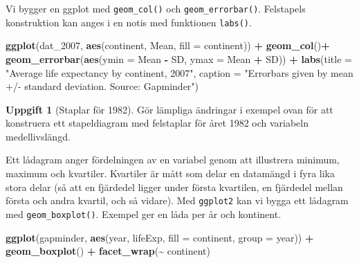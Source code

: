 \documentclass[
]{book}
\newenvironment{Shaded}{\begin{snugshade}}{\end{snugshade}}
\newcommand{\AttributeTok}[1]{\textcolor[rgb]{0.13,0.29,0.53}{#1}}
\newcommand{\FunctionTok}[1]{\textcolor[rgb]{0.13,0.29,0.53}{\textbf{#1}}}
\newcommand{\NormalTok}[1]{#1}
\newcommand{\SpecialCharTok}[1]{\textcolor[rgb]{0.81,0.36,0.00}{\textbf{#1}}}
\newcommand{\StringTok}[1]{\textcolor[rgb]{0.31,0.60,0.02}{#1}}
\theoremstyle{definition}
\theoremstyle{definition}
\theoremstyle{definition}
\newtheorem{exercise}{Uppgift}[chapter]
\theoremstyle{definition}
\theoremstyle{remark}
\begin{document}
Vi bygger en ggplot med \texttt{geom\_col()} och \texttt{geom\_errorbar()}. Felstapels konstruktion kan anges i en notis med funktionen \texttt{labs()}.

\begin{Shaded}
\begin{Highlighting}[]
\FunctionTok{ggplot}\NormalTok{(dat\_2007, }\FunctionTok{aes}\NormalTok{(continent, Mean, }\AttributeTok{fill =}\NormalTok{ continent)) }\SpecialCharTok{+}
  \FunctionTok{geom\_col}\NormalTok{()}\SpecialCharTok{+}                                            
  \FunctionTok{geom\_errorbar}\NormalTok{(}\FunctionTok{aes}\NormalTok{(}\AttributeTok{ymin =}\NormalTok{ Mean }\SpecialCharTok{{-}}\NormalTok{ SD, }\AttributeTok{ymax =}\NormalTok{ Mean }\SpecialCharTok{+}\NormalTok{ SD)) }\SpecialCharTok{+}
  \FunctionTok{labs}\NormalTok{(}\AttributeTok{title =} \StringTok{"Average life expectancy by continent, 2007"}\NormalTok{,}
       \AttributeTok{caption =} \StringTok{"Errorbars given by mean +/{-} standard deviation.}
\StringTok{       Source: Gapminder"}\NormalTok{)}
\end{Highlighting}
\end{Shaded}

\begin{exercise}[Staplar för 1982]
Gör lämpliga ändringar i exempel ovan för att konstruera ett stapeldiagram med felstaplar för året 1982 och variabeln medellivslängd.
\end{exercise}

Ett lådagram anger fördelningen av en variabel genom att illustrera minimum, maximum och kvartiler. Kvartiler är mått som delar en datamängd i fyra lika stora delar (så att en fjärdedel ligger under första kvartilen, en fjärdedel mellan första och andra kvartil, och så vidare). Med \texttt{ggplot2} kan vi bygga ett lådagram med \texttt{geom\_boxplot()}. Exempel ger en låda per år och kontinent.

\begin{Shaded}
\begin{Highlighting}[]
\FunctionTok{ggplot}\NormalTok{(gapminder, }\FunctionTok{aes}\NormalTok{(year, lifeExp, }\AttributeTok{fill =}\NormalTok{ continent, }
                      \AttributeTok{group =}\NormalTok{ year)) }\SpecialCharTok{+}
  \FunctionTok{geom\_boxplot}\NormalTok{() }\SpecialCharTok{+}                                                     
  \FunctionTok{facet\_wrap}\NormalTok{(}\SpecialCharTok{\textasciitilde{}}\NormalTok{ continent)                                              }
\end{Highlighting}
\end{Shaded}
\end{document}
